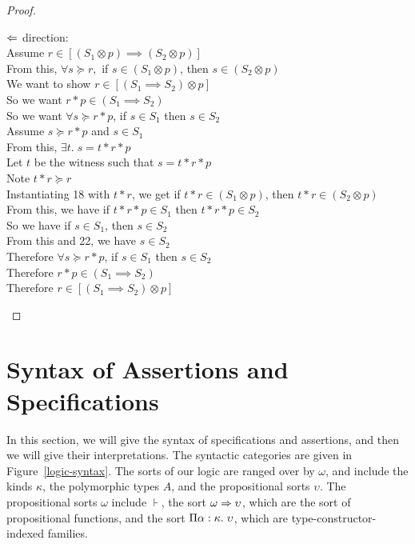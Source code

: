\begin{proof}
\begin{tabbedproof}
\ooo $\Leftarrow$ direction: \\
\oooo Assume $r \in [(S_1 \otimes p) \implies (S_2 \otimes p)]$ \\
\ooooo From this, $\forall s \succeq r,$ if $s \in (S_1 \otimes p)$, then $s \in (S_2 \otimes p)$ \\
\ooooo We want to show $r \in [(S_1 \implies S_2) \otimes p]$ \\
\ooooo So we want $r * p \in (S_1 \implies S_2)$ \\
\ooooo So we want $\forall s \succeq r * p$, if $s \in S_1$ then $s \in S_2$ \\
\ooooo Assume $s \succeq r * p$ and $s \in S_1$ \\
\oooooo From this, $\exists t.\; s = t * r * p$ \\
\oooooo Let $t$ be the witness such that $s = t * r * p$ \\ 
\ooooooo Note $t * r \succeq r$ \\
\ooooooo Instantiating 18 with $t * r$, we get if $t * r \in (S_1 \otimes p)$, then $t * r \in (S_2 \otimes p)$ \\
\ooooooo From this, we have if $t * r * p \in S_1$ then $t * r * p \in S_2$ \\
\ooooooo So we have if $s \in S_1$, then $s \in S_2$ \\
\ooooooo From this and 22, we have $s \in S_2$ \\
\ooooo Therefore $\forall s \succeq r * p$, if $s \in S_1$ then $s \in S_2$ \\
\ooooo Therefore $r * p \in (S_1 \implies S_2)$ \\
\ooooo Therefore $r \in [(S_1 \implies S_2) \otimes p]$ 
\end{tabbedproof}
\end{proof}

\section{Syntax of Assertions and Specifications}

In this section, we will give the syntax of specifications and
assertions, and then we will give their interpretations. The syntactic
categories are given in Figure~\ref{logic-syntax}. The sorts of our
logic are ranged over by $\omega$, and include the kinds $\kappa$, the
polymorphic types $A$, and the propositional sorts $\upsilon$.  The
propositional sorts $\omega$ include $\assert$, the sort $\omega \Rightarrow
\upsilon$, which are the sort of propositional functions, and the sort
$\Pi {\alpha}:{\kappa}.\;{\upsilon}$, which are
type-constructor-indexed families.
 
